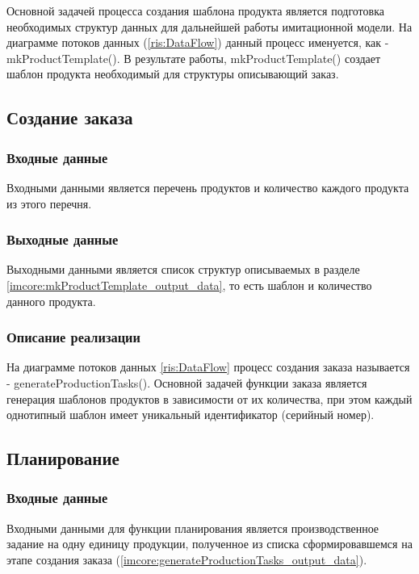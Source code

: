 Основной задачей процесса создания шаблона продукта является подготовка необходимых структур данных для дальнейшей работы имитационной модели. На диаграмме потоков данных (\ref{ris:DataFlow}) данный процесс именуется, как - mkProductTemplate(). В результате работы, mkProductTemplate() создает шаблон продукта необходимый для структуры описывающий заказ.

\subsection{Создание заказа}

\subsubsection*{Входные данные}
Входными данными является перечень продуктов и количество каждого продукта из этого перечня.

\label{imcore:generateProductionTasks_output_data}

\subsubsection*{Выходные данные}
Выходными данными является список структур описываемых в разделе \ref{imcore:mkProductTemplate_output_data}, то есть шаблон и количество данного продукта.

\subsubsection*{Описание реализации}
На диаграмме потоков данных \ref{ris:DataFlow} процесс создания заказа называется - generateProductionTasks(). Основной задачей функции заказа является генерация шаблонов продуктов в зависимости от их количества, при этом каждый однотипный шаблон имеет уникальный идентификатор (серийный номер).


\subsection{Планирование}

\subsubsection*{Входные данные}
Входными данными для функции планирования является производственное задание на одну единицу продукции, полученное из списка сформировавшемся на этапе создания заказа (\ref{imcore:generateProductionTasks_output_data}).

